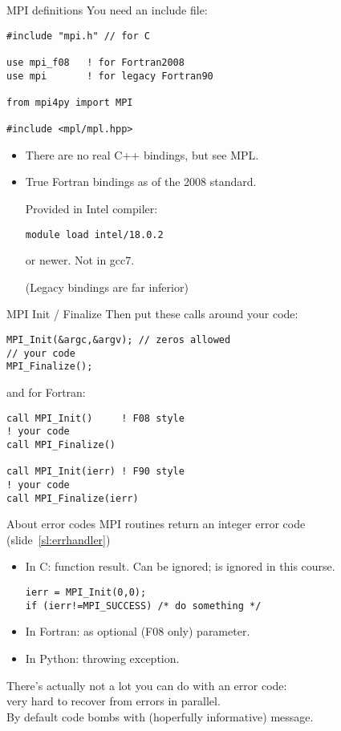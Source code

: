 \begin{mpithree}
\begin{numberedframe}{MPI definitions}
\label{sl:mpi-header}
You need an include file:
\begin{verbatim}
#include "mpi.h" // for C

use mpi_f08   ! for Fortran2008
use mpi       ! for legacy Fortran90

from mpi4py import MPI
  
#include <mpl/mpl.hpp>
\end{verbatim}
\begin{itemize}
\item There are no real C++ bindings, but see MPL.
\item True Fortran bindings as of the 2008 standard.
\begin{tacc}
Provided in Intel compiler:
\begin{verbatim}
module load intel/18.0.2
\end{verbatim}
or newer. Not in gcc7.
\end{tacc}
(Legacy bindings are far inferior)
\end{itemize}
\end{numberedframe}

\begin{numberedframe}{MPI Init / Finalize}
Then put these calls around your code:
\lstset{language=C}
\begin{lstlisting}
MPI_Init(&argc,&argv); // zeros allowed
// your code
MPI_Finalize();  
\end{lstlisting}
and for Fortran:
\lstset{language=Fortran}
\begin{lstlisting}
call MPI_Init()     ! F08 style
! your code
call MPI_Finalize()

call MPI_Init(ierr) ! F90 style
! your code
call MPI_Finalize(ierr)
\end{lstlisting}
\end{numberedframe}
\end{mpithree}

\begin{numberedframe}{About error codes}
  MPI routines return an integer error code
  (slide~\ref{sl:errhandler})
  \begin{itemize}
  \item In C: function result. Can be ignored; is ignored in this course.
\lstset{language=C++}
\begin{lstlisting}
ierr = MPI_Init(0,0);
if (ierr!=MPI_SUCCESS) /* do something */
\end{lstlisting}
  \item In Fortran: as optional (F08 only) parameter.
  \item In Python: throwing exception.
  \end{itemize}
  There's actually not a lot you can do with an error code:\\
  very hard to recover from errors in parallel.\\
  By default code bombs with (hoperfully informative) message.
\end{numberedframe}

